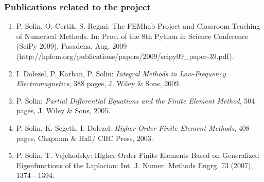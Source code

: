 \documentclass[11pt,letterpaper]{article}
\begin{document}
\subsubsection*{Publications related to the project}
\begin{enumerate}
\item P. Solin, O. Certik, S. Regmi: The FEMhub Project and Classroom Teaching of Numerical Methods. 
      In: Proc. of the 8th Python in Science Conference (SciPy 2009), Pasadena, 
      Aug. 2009 (http://hpfem.org/publications/papers/2009/scipy09\_paper-39.pdf).
\vspace{-3mm}
\item I. Dolezel, P. Karban, P. Solin: {\em Integral Methods in Low-Frequency 
      Electromagnetics}, 388 pages, J. Wiley \& Sons, 2009.
\vspace{-3mm}
\item P. Solin: {\em Partial Differential Equations and the 
      Finite Element Method}, 504 pages, J. Wiley \& Sons, 2005. 
\vspace{-3mm}
\item P. Solin, K. Segeth, I. Dolezel:
      {\em Higher-Order Finite Element Methods}, 408 pages, 
      Chapman \& Hall/ CRC Press, 2003.
\vspace{-3mm}
\item P. Solin, T. Vejchodsky: Higher-Order Finite Elements 
      Based on Generalized Eigenfunctions of the Laplacian: 
      Int. J. Numer. Methods Engrg. 73 (2007), 1374 - 1394.
\end{enumerate}

\vspace{-4mm}
\noindent
\end{document}
